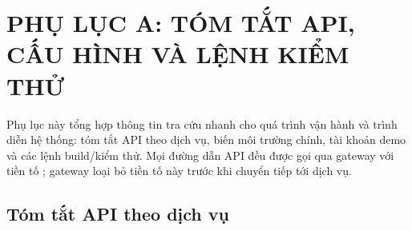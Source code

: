 \chapter{PHỤ LỤC A: TÓM TẮT API, CẤU HÌNH VÀ LỆNH KIỂM THỬ}
\label{chap:phu-luc}

Phụ lục này tổng hợp thông tin tra cứu nhanh cho quá trình vận hành và trình diễn hệ thống: tóm tắt API theo dịch vụ, biến môi trường chính, tài khoản demo và các lệnh build/kiểm thử. Mọi đường dẫn API đều được gọi qua gateway với tiền tố ; gateway loại bỏ tiền tố này trước khi chuyển tiếp tới dịch vụ.

\section{Tóm tắt API theo dịch vụ}
\label{sec:tom-tat-api}

